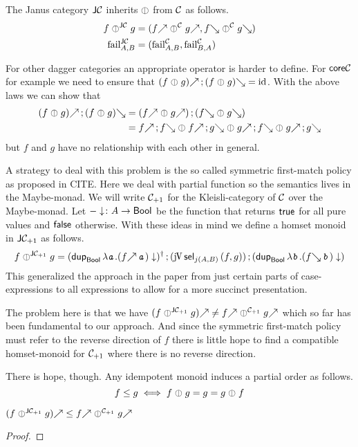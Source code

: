 \documentclass[runningheads,envcountsame]{llncs}
\begin{document}
    The Janus category $\mathsf{J}\mathcal{C}$ inherits $\orelse$ from $\mathcal{C}$ as follows. 
    \begin{align*}
        f \orelse[\JC] g &= (\f{f} \orelse[\C] \f{g}, \b{f} \orelse[\C] \b{g}) \\
        \fail[\JC]_{A, B} &= (\fail[\C]_{A, B}, \fail[\C]_{B, A}) 
    \end{align*}
    
    For other dagger categories an appropriate operator is harder to define. For $\mathsf{core}\mathcal{C}$ for example we need to ensure that $\comp{\f{(f \orelse g)}}{\b{(f \orelse g)}} = \id$. With the above laws we can show that \begin{align*}
        \comp{\f{(f \orelse g)}}{\b{(f \orelse g)}} &= \comp{(\f{f} \orelse \f{g})}{(\b{f} \orelse \b{g})} \\
        &= \comp{\f{f}}{\b{f}} \orelse \comp{\f{f}}{\b{g}} \orelse \comp{\f{g}}{\b{f}} \orelse \comp{\f{g}}{\b{g}}
    \end{align*}
    but $f$ and $g$ have no relationship with each other in general. 
    
    A strategy to deal with this problem is the so called symmetric first-match policy as proposed in CITE. Here we deal with partial function so the semantics lives in the Maybe-monad. We will write $\mathcal{C}_{+1}$ for the Kleisli-category of $\mathcal{C}$ over the Maybe-monad. Let $-\downarrow\colon A \to \tbool$ be the function that returns $\mathsf{true}$ for all pure values and $\mathsf{false}$ otherwise. With these ideas in mind we define a homset monoid in $\mathsf{J}\mathcal{C}_{+1}$ as follows.\[
    f \orelse^{\JC_{+1}} g = \comp{\rev{(\eapp{\duplicate_{\tbool}}{\elam{\evar{a}}{ (\eapp{\f{f}}{\evar{a}})\downarrow}})}}{\comp{(\juncurry\,\eapp{\select_{\homJ{A}{j}{B}}}{\epair{f}{g}})}{(\eapp{\duplicate_{\tbool}}{\elam{\evar{b}}{(\eapp{\b{f}}{\evar{b}})\downarrow}})}}
    \]
    This generalized the approach in the paper from just certain parts of case-expressions to all expressions to allow for a more succinct presentation.
    
    The problem here is that we have $\f{(f \orelse^{\JC_{+1}} g)} \neq \f{f} \orelse^{\C_{+1}} \f{g}$ which so far has been fundamental to our approach. And since the symmetric first-match policy must refer to the reverse direction of $f$ there is little hope to find a compatible homset-monoid for $\mathcal{C}_{+1}$ where there is no reverse direction.
    
    There is hope, though. Any idempotent monoid induces a partial order as follows.
    \[
    f \leq g \iff f \orelse g = g = g \orelse f
    \]
    \begin{lemma}
        $\f{(f \orelse^{\JC_{+1}} g)} \leq \f{f} \orelse^{\C_{+1}} \f{g}$
    \end{lemma}
    \begin{proof}
    \end{proof}
    
\end{document}
